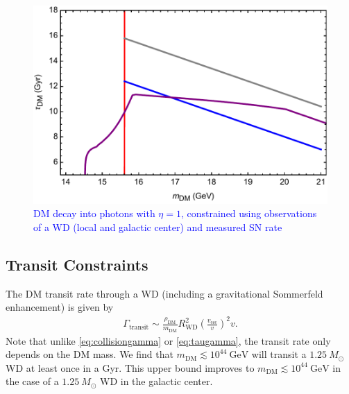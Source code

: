 \documentclass[twocolumn,showpacs,preprintnumbers,amsmath,amssymb,prd]{revtex4}
\newcommand{\GeV}{\text{GeV}}
\def\r{\right)}
\def\l{\left(}
\begin{document}
\begin{figure}
\includegraphics[scale=.45]{decayobservation.pdf}
\caption{\textcolor{blue}{DM decay into photons with $\eta =1$, constrained using observations of a WD (local and galactic center) and measured SN rate}}
\label{fig:decayclasses}
\end{figure}
 
\subsection{Transit Constraints}
\label{sec:TransitConstraints}

The DM transit rate through a WD (including a gravitational Sommerfeld enhancement) is given by
\begin{align}
\Gamma_\text{transit} \sim \frac{\rho_{\text{DM}}}{m_\text{DM}} R_\text{WD}^2 \l\frac{v_\text{esc}}{v}\r^2 v.
\label{eq:TransitFluxCondition}
\end{align}
Note that unlike \eqref{eq:collisiongamma} or \eqref{eq:taugamma}, the transit rate only depends on the DM mass.
We find that $m_\text{DM} \lesssim 10^{44} ~\GeV$ will transit a $1.25 ~M_{\odot}$ WD at least once in a Gyr.
This upper bound improves to $m_\text{DM} \lesssim 10^{44} ~\GeV$ in the case of a $1.25 ~M_{\odot}$ WD in the galactic center.
\end{document}
